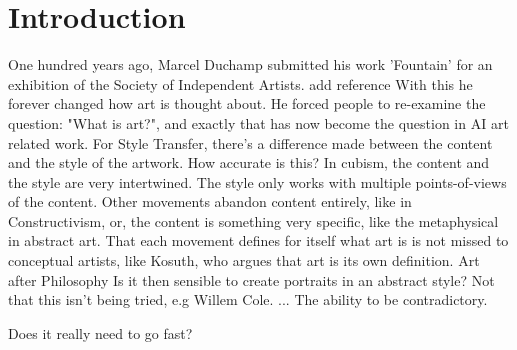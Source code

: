 \chapter*{Introduction}
\label{chap:intro}

One hundred years ago, Marcel Duchamp submitted his work 'Fountain' for an exhibition of the Society of Independent Artists. {add reference}
With this he forever changed how art is thought about. He forced people to re-examine the question: "What is art?", and exactly that has now become the question in AI art related work.
For Style Transfer, there's a difference made between the content and the style of the artwork. How accurate is this?
In cubism, the content and the style are very intertwined. The style only works with multiple points-of-views of the content.
Other movements abandon content entirely, like in Constructivism, or, the content is something very specific, like the metaphysical in abstract art.
That each movement defines for itself what art is is not missed to conceptual artists, like Kosuth, who argues that art is its own definition. {Art after Philosophy}
Is it then sensible to create portraits in an abstract style? Not that this isn't being tried, e.g Willem Cole.
...
The ability to be contradictory.

Does it really need to go fast?